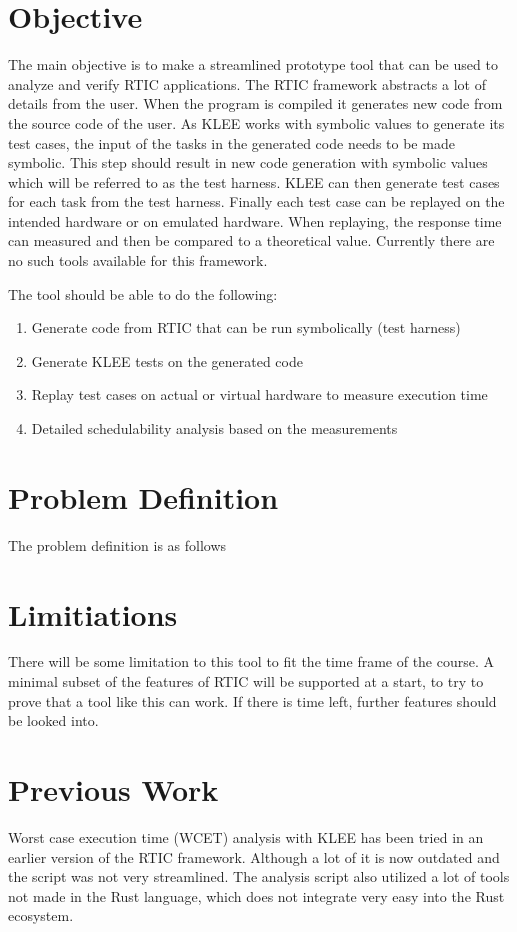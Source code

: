 \section{Objective}
The main objective is to make a streamlined prototype tool that can be used to
analyze and verify RTIC applications. The RTIC framework abstracts a lot of
details from the user. When the program is compiled it generates new code from
the source code of the user. As KLEE works with symbolic values to generate its
test cases, the input of the tasks in the generated code needs to be made
symbolic. This step should result in new code generation with symbolic values
which will be referred to as the test harness. KLEE can then generate test
cases for each task from the test harness. Finally each test case can be
replayed on the intended hardware or on emulated hardware. When replaying, the
response time can measured and then be compared to a theoretical value.
Currently there are no such tools available for this framework.

The tool should be able to do the following:
%
\begin{enumerate}
    \item Generate code from RTIC that can be run symbolically (test harness)
    \item Generate KLEE tests on the generated code
    \item Replay test cases on actual or virtual hardware to measure execution time
    \item Detailed schedulability analysis based on the measurements
\end{enumerate}

\section{Problem Definition}
The problem definition is as follows

\section{Limitiations}
There will be some limitation to this tool to fit the time frame of the course.
A minimal subset of the features of RTIC will be supported at a start, to try
to prove that a tool like this can work. If there is time left, further
features should be looked into. 

\section{Previous Work}
Worst case execution time (WCET) analysis with KLEE has been tried in an earlier
version of the RTIC framework\cite{lindner}. Although a lot of it is now
outdated and the script was not very streamlined. The analysis script also 
utilized a lot of tools not made in the Rust language, which does not integrate
very easy into the Rust ecosystem.

